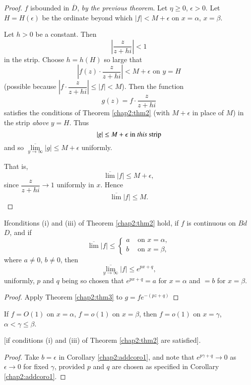 \begin{proof}
$f$ is\pageoriginale bounded in $\overline{D}$, \textit{by the previous
    theorem}. Let $\eta \geq 0$, $\epsilon > 0$. Let $H= H
  (\epsilon)$ be the ordinate beyond which $|f|<M + \epsilon$ on
  $x =\alpha$, $x = \beta$.

Let $h >0$ be a constant. Then
$$
\left|\frac{z}{z+h i} \right| <1
$$
in the strip. Choose $h = h (H)$ so large that
$$
\left|f(z) \cdot \frac{z}{z+hi} \right| < M + \epsilon \text{ on } y =
H 
$$
(possible because $\left| f \cdot \dfrac{z}{z+hi} \right| \leq |f| <
M$). Then the function
$$
g(z) = f \cdot \frac{z}{z+hi}
$$
satisfies the conditions of Theorem \ref{chap2:thm2} (with $M + \epsilon$ in place
of $M$) in the strip \textit{above} $y = H$. Thus
$$
|g| \leq M + \epsilon \text{ in {\em this} strip}
$$
and so $\overline{\lim\limits_{y \to \infty}} |g| \leq M +
\epsilon$ uniformly.

That is, 
$$
\overline{\lim} |f|\leq M + \epsilon,
$$
since $\dfrac{z}{z + hi} \to 1$ uniformly in $x$. Hence
$$
\overline{\lim} |f| \leq M.
$$
\end{proof}

\setcounter{corollary}{0}
\begin{corollary}\label{chap2:addcoro1}
If\pageoriginale conditions (i) and (iii) of Theorem \ref{chap2:thm2} hold, if $f$ is
continuous on $Bd$ $D$, and if 
$$
\overline{\lim} |f| \leq 
\begin{cases}
a & \text{ on } x = \alpha,\\
b & \text{ on } x = \beta,
\end{cases}
$$
where $a \neq 0$, $b \neq 0$, then
$$
\overline{\lim_{y \to \infty}} |f| \leq e^{px + q},
$$ 
uniformly, $p$ and $q$ being so chosen that $e^{px+q} = a$ for $x =
\alpha$ and $ = b$ for $x = \beta$.
\end{corollary}

\begin{proof}
Apply Theorem \ref{chap2:thm3} to $g = f e^{-(pz+q)}$ 
\end{proof}

\begin{corollary}\label{chap2:addcoro2}
If $f = O(1)$ on $x = \alpha$, $f = o(1)$ on $x = \beta$, then $f =
o(1)$ on $x = \gamma$, $\alpha < \gamma \leq \beta$.

[if conditions (i) and (iii) of Theorem \ref{chap2:thm2} are satisfied].
\end{corollary}

\begin{proof}
Take $b = \epsilon$ in Corollary \ref{chap2:addcoro1}, and note that
$e^{p\gamma + q} \to 0$ as $\epsilon \to 0$ for fixed $\gamma$,
provided $p$ and $q$ are chosen as specified in Corollary \ref{chap2:addcoro1}. 
\end{proof}
